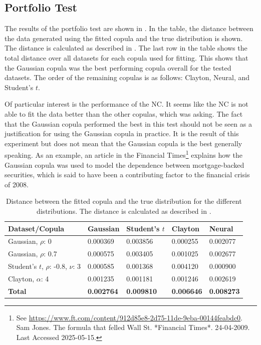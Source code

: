 \subsection{Portfolio Test}
The results of the portfolio test are shown in . In the table, the distance between the data generated using the fitted copula and the true distribution is shown. The distance is calculated as described in . The last row in the table shows the total distance over all datasets for each copula used for fitting. This shows that the Gaussian copula was the best performing copula overall for the tested datasets. The order of the remaining copulas is as follows: Clayton, Neural, and Student's $t$. 

Of particular interest is the performance of the \gls{NC}. It seems like the \gls{NC} is not able to fit the data better than the other copulas, which \RQthree{} was asking. The fact that the Gaussian copula performed the best in this test should not be seen as a justification for using the Gaussian copula in practice. It is the result of this experiment but does not mean that the Gaussian copula is the best generally speaking. As an example, an article in the Financial Times\footnote{See \url{https://www.ft.com/content/912d85e8-2d75-11de-9eba-00144feabdc0}. Sam Jones. The formula that felled Wall St. *Financial Times*. 24-04-2009. Last Accessed 2025-05-15.} explains how the Gaussian copula was used to model the dependence between mortgage-backed securities, which is said to have been a contributing factor to the financial crisis of 2008.

\begin{table}[h!]
    \centering
    \caption{Distance between the fitted copula and the true distribution for the different distributions. The distance is calculated as described in .}
    \begin{tabular}{lllll}
    \textbf{Dataset/Copula} & \textbf{Gaussian} & \textbf{Student's $t$} & \textbf{Clayton} & \textbf{Neural} \\
    \hline
    Gaussian, $\rho$: 0               & 0.000369 & 0.003856 & 0.000255 & 0.002077 \\
    Gaussian, $\rho$: 0.7             & 0.000575 & 0.003405 & 0.001025 & 0.002677 \\
    Student's $t$, $\rho$: -0.8, $\nu$: 3 & 0.000585 & 0.001368 & 0.004120 & 0.000900 \\ 
    Clayton, $\alpha$: 4              & 0.001235 & 0.001181 & 0.001246 & 0.002619 \\
    \textbf{Total}      & \textbf{0.002764} & \textbf{0.009810} & \textbf{0.006646} & \textbf{0.008273} \\
    \end{tabular}
    \label{tab:DistributionDistances}
\end{table}

